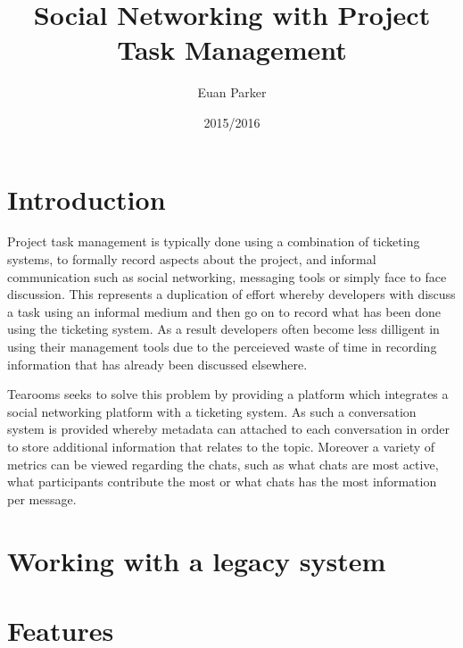 \documentclass{l4proj}
\begin{document}
\title{Social Networking with Project Task Management}
\author{Euan Parker}
\date{2015/2016}
\maketitle

\begin{abstract}

\end{abstract}

\educationalconsent
%
%
\tableofcontents

\chapter{Introduction}


Project task management is typically done using a combination of ticketing systems, to formally record aspects about the project, and informal communication such as social networking, messaging tools or simply face to face discussion. This represents a duplication of effort whereby developers with discuss a task using an informal medium and then go on to record what has been done using the ticketing system.  As a result developers often become less dilligent in using their management tools due to the perceieved waste of time in recording information that has already been discussed elsewhere. 

Tearooms seeks to solve this problem by providing a platform which integrates a social networking platform with a ticketing system.  As such a conversation system is provided whereby metadata can attached to each conversation in order to store additional information that relates to the topic.  Moreover a variety of metrics can be viewed regarding the chats, such as what chats are most active, what participants contribute the most or what chats has the most information per message.

\chapter{Working with a legacy system}

\chapter{Features}
\end{document}
